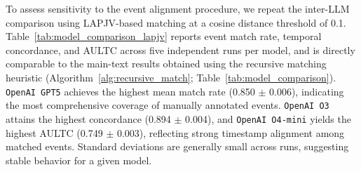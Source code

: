 To assess sensitivity to the event alignment procedure, we repeat the inter-LLM comparison using LAPJV-based matching at a cosine distance threshold of 0.1. Table~\ref{tab:model_comparison_lapjv} reports event match rate, temporal concordance, and AULTC across five independent runs per model, and is directly comparable to the main-text results obtained using the recursive matching heuristic (Algorithm~\ref{alg:recursive_match}; Table~\ref{tab:model_comparison}).
\texttt{OpenAI GPT5} achieves the highest mean match rate (0.850 $\pm$ 0.006), indicating the most comprehensive coverage of manually annotated events. \texttt{OpenAI O3} attains the highest concordance (0.894 $\pm$ 0.004), and \texttt{OpenAI O4-mini} yields the highest AULTC (0.749 $\pm$ 0.003), reflecting strong timestamp alignment among matched events. Standard deviations are generally small across runs, suggesting stable behavior for a given model.


